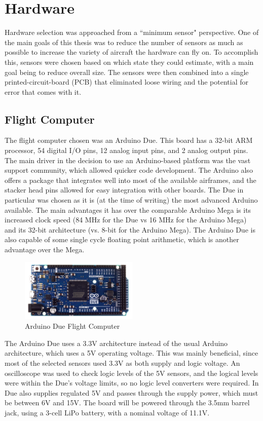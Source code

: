 \chapter{Hardware}
\label{hardware}
Hardware selection was approached from a ``minimum sensor" perspective. One of the main goals of this thesis was to reduce the number of sensors as much as possible to increase the variety of aircraft the hardware can fly on. To accomplish this, sensors were chosen based on which state they could estimate, with a main goal being to reduce overall size. The sensors were then combined into a single printed-circuit-board (PCB) that eliminated loose wiring and the potential for error that comes with it. 

\section{Flight Computer}
The flight computer chosen was an Arduino Due. This board has a 32-bit ARM processor, 54 digital I/O pins, 12 analog input pins, and 2 analog output pins. The main driver in the decision to use an Arduino-based platform was the vast support community, which allowed quicker code development. The Arduino also offers a package that integrates well into most of the available airframes, and the stacker head pins allowed for easy integration with other boards. The Due in particular was chosen as it is (at the time of writing) the most advanced Arduino available. The main advantages it has over the comparable Arduino Mega is its increased clock speed (84 MHz for the Due\cite{Atmel2012} vs 16 MHz for the Arduino Mega\cite{Atmel2012atmega}) and its 32-bit architecture (vs. 8-bit for the Arduino Mega). The Arduino Due is also capable of some single cycle floating point arithmetic\cite{Atmel2012}, which is another advantage over the Mega.

\begin{figure}[H]
  \caption{Arduino Due Flight Computer} \label{arduinoPicture}
  \centering
    \includegraphics[width=0.5\textwidth]{figures/arduinoDue.jpg}
\end{figure}

The Arduino Due uses a 3.3V architecture instead of the usual Arduino architecture, which uses a 5V operating voltage. This was mainly beneficial, since most of the selected sensors used 3.3V as both supply and logic voltage. An oscilloscope was used to check logic levels of the 5V sensors, and the logical levels were within the Due's voltage limits, so no logic level converters were required. In Due also supplies regulated 5V and passes through the supply power, which must be between 6V and 15V. The board will be powered through the 3.5mm barrel jack, using a 3-cell LiPo battery, with a nominal voltage of 11.1V.

